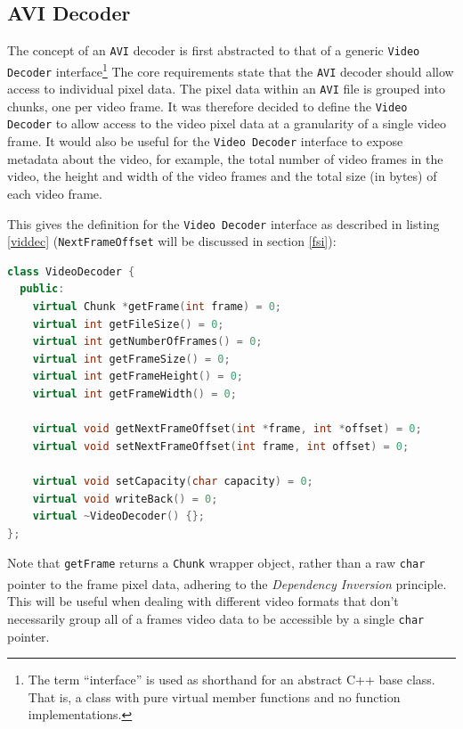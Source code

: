\documentclass[paper=a4, fontsize=11pt,twoside]{scrartcl}
\numberwithin{table}{section}
\numberwithin{figure}{section}
\numberwithin{algorithm}{section}
\begin{document}
\subsection{AVI Decoder}
\label{avidec}

The concept of an \texttt{AVI} decoder is first abstracted to that of a generic \texttt{Video Decoder} interface\footnote{The term ``interface'' is used as shorthand for an abstract C++ base class. That is, a class with pure virtual member functions and no function implementations.} The core requirements state that the \texttt{AVI} decoder should allow access to individual pixel data. The pixel data within an \texttt{AVI} file is grouped into chunks, one per video frame. It was therefore decided to define the \texttt{Video Decoder} to allow access to the video pixel data at a granularity of a single video frame. It would also be useful for the \texttt{Video Decoder} interface to expose metadata about the video, for example, the total number of video frames in the video, the height and width of the video frames and the total size (in bytes) of each video frame.

This gives the definition for the \texttt{Video Decoder} interface as described in listing \ref{viddec} (\texttt{NextFrameOffset} will be discussed in section \ref{fsi}):

\begin{lstlisting}[language=C++, caption={Video Decoder interface (\texttt{video/video\_decoder.h:15})},frame=single, float,floatplacement=H,label=viddec]
class VideoDecoder {
  public:
    virtual Chunk *getFrame(int frame) = 0;
    virtual int getFileSize() = 0;
    virtual int getNumberOfFrames() = 0;
    virtual int getFrameSize() = 0;
    virtual int getFrameHeight() = 0;
    virtual int getFrameWidth() = 0;
	
    virtual void getNextFrameOffset(int *frame, int *offset) = 0;
    virtual void setNextFrameOffset(int frame, int offset) = 0;
   	   
    virtual void setCapacity(char capacity) = 0;
    virtual void writeBack() = 0;
    virtual ~VideoDecoder() {};
};
\end{lstlisting}

Note that \texttt{getFrame} returns a \texttt{Chunk} wrapper object, rather than a raw \texttt{char} pointer to the frame pixel data, adhering to the \textit{Dependency Inversion} principle\textsuperscript{\cite{inver}}. This will be useful when dealing with different video formats that don't necessarily group all of a frames video data to be accessible by a single \texttt{char} pointer.
\end{document}
